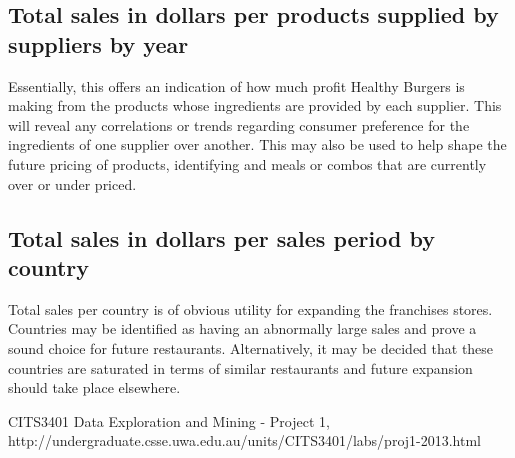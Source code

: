 \documentclass[12pt, a4paper]{article}
\begin{document}
\subsection*{Total sales in dollars per products supplied by suppliers by year}

Essentially, this offers an indication of how much profit Healthy Burgers is making from the products whose ingredients are provided by each supplier. This will reveal any correlations or trends regarding consumer preference for the ingredients of one supplier over another. This may also be used to help shape the future pricing of products, identifying and meals or combos that are currently over or under priced.

\subsection*{Total sales in dollars per sales period by country}

Total sales per country is of obvious utility for expanding the franchises stores. Countries may be identified as having an abnormally large sales and prove a sound choice for future restaurants. Alternatively, it may be decided that these countries are saturated in terms of similar restaurants and future expansion should take place elsewhere.

\begin{thebibliography}{9}

	CITS3401 Data Exploration and Mining - Project 1,
	http://undergraduate.csse.uwa.edu.au/units/CITS3401/labs/proj1-2013.html
		
\end{thebibliography}



\appendix
\end{document}

